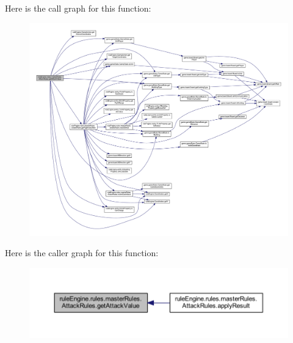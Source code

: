Here is the call graph for this function\+:
\nopagebreak
\begin{figure}[H]
\begin{center}
\leavevmode
\includegraphics[width=350pt]{classrule_engine_1_1rules_1_1master_rules_1_1_attack_rules_abbf934911508bc5804744745815493d5_cgraph}
\end{center}
\end{figure}
Here is the caller graph for this function\+:
\nopagebreak
\begin{figure}[H]
\begin{center}
\leavevmode
\includegraphics[width=350pt]{classrule_engine_1_1rules_1_1master_rules_1_1_attack_rules_abbf934911508bc5804744745815493d5_icgraph}
\end{center}
\end{figure}
\mbox{\label{classrule_engine_1_1rules_1_1master_rules_1_1_attack_rules_a80c89bcb3fe06834e0c1ef1772a8c71e}} 
